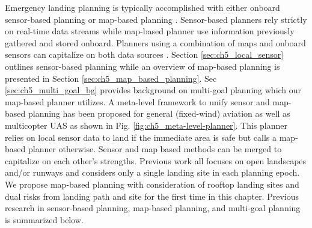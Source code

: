 Emergency landing planning is typically accomplished with either onboard sensor-based planning or map-based planning \cite{warren_enabling_2015, ten_harmsel_emergency_2017}.  Sensor-based planners rely strictly on real-time data streams while map-based planner use information previously gathered and stored onboard. Planners using a combination of maps and onboard sensors can capitalize on both data sources \cite{ten_harmsel_emergency_2017}.  Section \ref{sec:ch5_local_sensor} outlines sensor-based planning while an overview of map-based planning is presented in Section \ref{sec:ch5_map_based_planning}. Sec \ref{sec:ch5_multi_goal_bg} provides background on multi-goal planning which our map-based planner utilizes. A meta-level framework to unify sensor and map-based planning has been proposed for general (fixed-wind) aviation \cite{atkins_emergency_2006} as well as multicopter UAS \cite{ten_harmsel_emergency_2017} as shown in Fig. \ref{fig:ch5_meta-level-planner}. This planner relies on local sensor data to land if the immediate area is safe but calls a map-based planner otherwise. Sensor and map based methods can be merged to capitalize on each other's strengths. Previous work all focuses on open landscapes and/or runways and considers only a single landing site in each planning epoch. We propose map-based planning with consideration of rooftop landing sites and dual risks from landing path and site for the first time in this chapter.  Previous research in sensor-based planning, map-based planning, and multi-goal planning is summarized below.
